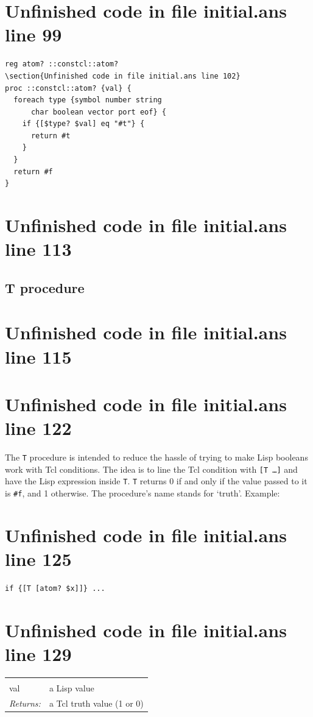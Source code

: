 \documentclass[twoside,9pt]{report}
\begin{document}
\section{Unfinished code in file initial.ans line 99}
\begin{lstlisting}
reg atom? ::constcl::atom?
\section{Unfinished code in file initial.ans line 102}
proc ::constcl::atom? {val} {
  foreach type {symbol number string
      char boolean vector port eof} {
    if {[$type? $val] eq "#t"} {
      return #t
    }
  }
  return #f
}
\end{lstlisting}
\section{Unfinished code in file initial.ans line 113}
\subsection{T procedure}
\label{t-procedure}
\section{Unfinished code in file initial.ans line 115}

\section{Unfinished code in file initial.ans line 122}

The \texttt{T} procedure is intended to reduce the hassle of trying to make Lisp booleans work with Tcl conditions. The idea is to line the Tcl condition with \texttt{[T \ldots ]} and have the Lisp expression inside \texttt{T}. \texttt{T} returns 0 if and only if the value passed to it is \texttt{\#f}, and 1 otherwise. The procedure's name stands for `truth'. Example:

\section{Unfinished code in file initial.ans line 125}
\begin{verbatim}
if {[T [atom? $x]]} ...
\end{verbatim}
\section{Unfinished code in file initial.ans line 129}
\noindent\begin{tabular}{ |p{1.9cm} p{8cm}| }
\hline
\rowcolor[HTML]{CCCCCC} \multicolumn{2}{|l|}{\bf T (internal)} \\
val & a Lisp value \\
\textit{Returns:} & a Tcl truth value (1 or 0) \\
\hline
\end{tabular}
\end{document}
